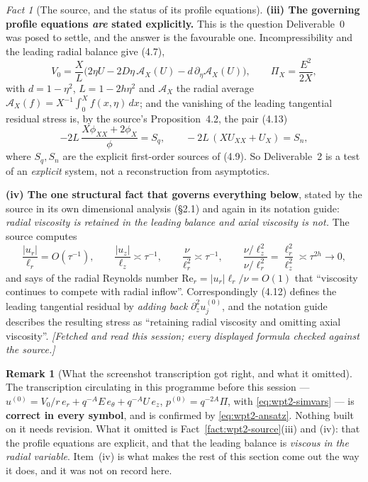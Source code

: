 \documentclass[11pt]{article}
\theoremstyle{definition}
\newtheorem{remark}[theorem]{Remark}
\theoremstyle{remark}
\newtheorem{fact}[theorem]{Fact}
\newcommand{\abs}[1]{\left|#1\right|}
\begin{document}
\begin{fact}[The source, and the status of its profile equations]
  \textbf{(iii) The governing profile equations \emph{are} stated
  explicitly.} This is the question Deliverable~0 was posed to settle, and
  the answer is the favourable one. Incompressibility and the leading radial
  balance give (4.7),
  \begin{equation}\label{eq:wpt2-47}
    V_0=\frac{X}{L}\bigl(2\eta U-2D\eta\,\mathcal A_X(U)
      -d\,\partial_\eta\mathcal A_X(U)\bigr),
    \qquad
    \Pi_X=\frac{E^2}{2X},
  \end{equation}
  with $d=1-\eta^2$, $L=1-2h\eta^2$ and $\mathcal A_X$ the radial average
  $\mathcal A_X(f)=X^{-1}\int_0^Xf(x,\eta)\,dx$; and the vanishing of the
  leading tangential residual stress is, by the source's Proposition~4.2,
  the pair (4.13)
  \begin{equation}\label{eq:wpt2-413}
    -2L\,\frac{X\phi_{XX}+2\phi_X}{\phi}=S_q,
    \qquad
    -2L\,(XU_{XX}+U_X)=S_n,
  \end{equation}
  where $S_q,S_n$ are the explicit first-order sources of (4.9). So
  Deliverable~2 is a test of an \emph{explicit} system, not a
  reconstruction from asymptotics.

  \textbf{(iv) The one structural fact that governs everything below},
  stated by the source in its own dimensional analysis (\S2.1) and again in
  its notation guide: \emph{radial viscosity is retained in the leading
  balance and axial viscosity is not.} The source computes
  \[
    \frac{\abs{u_r}}{\ell_r}=O(\tau^{-1}),\qquad
    \frac{\abs{u_z}}{\ell_z}\asymp\tau^{-1},\qquad
    \frac{\nu}{\ell_r^2}\asymp\tau^{-1},\qquad
    \frac{\nu/\ell_z^2}{\nu/\ell_r^2}=\frac{\ell_r^2}{\ell_z^2}
      \asymp\tau^{2h}\longrightarrow0,
  \]
  and says of the radial Reynolds number
  $\mathrm{Re}_r=\abs{u_r}\ell_r/\nu=O(1)$ that ``viscosity continues to
  compete with radial inflow''. Correspondingly (4.12) defines the leading
  tangential residual by \emph{adding back} $\partial_z^2u_j^{(0)}$, and the
  notation guide describes the resulting stress as ``retaining radial
  viscosity and omitting axial viscosity''.
  \emph{[Fetched and read this session; every displayed formula checked
  against the source.]}
\end{fact}

\begin{remark}[What the screenshot transcription got right, and what it
  omitted]\label{rem:wpt2-transcription}
  The transcription circulating in this programme before this session
  --- $u^{(0)}=V_0/r\,e_r+q^{-A}E\,e_\theta+q^{-A}U\,e_z$,
  $p^{(0)}=q^{-2A}\Pi$, with \eqref{eq:wpt2-simvars} --- is
  \textbf{correct in every symbol}, and is confirmed by
  \eqref{eq:wpt2-ansatz}. Nothing built on it needs revision. What it omitted
  is Fact~\ref{fact:wpt2-source}(iii) and (iv): that the profile equations
  are explicit, and that the leading balance is \emph{viscous in the radial
  variable}. Item~(iv) is what makes the rest of this section come out the
  way it does, and it was not on record here.
\end{remark}
\end{document}
